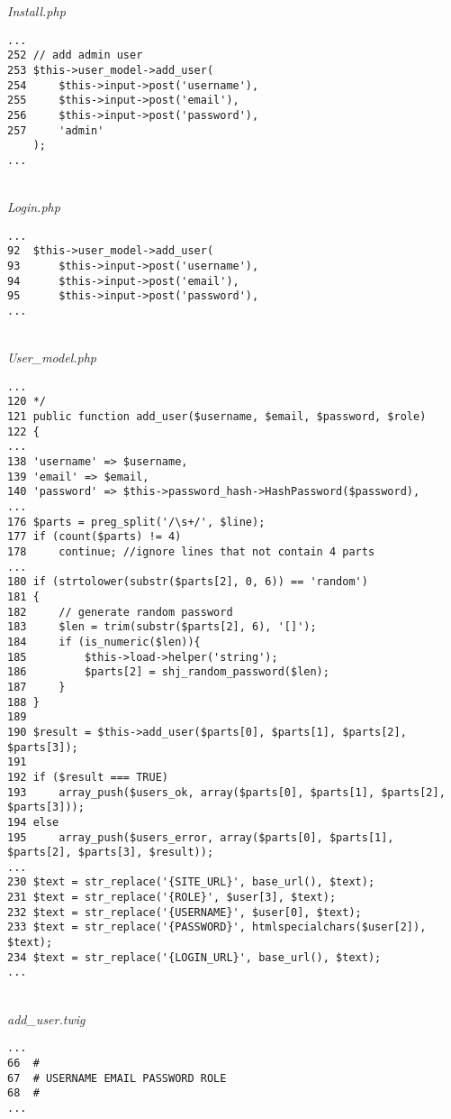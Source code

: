 \textit{Install.php}
\begin{lstlisting}[basicstyle=\ttfamily, frame=single,
columns=fullflexible, keepspaces=true, breaklines=true]
...
252	// add admin user
253	$this->user_model->add_user(
254		$this->input->post('username'),
255		$this->input->post('email'),
256		$this->input->post('password'),
257		'admin'
	);
...
\end{lstlisting}
~\\
\textit{Login.php}
\begin{lstlisting}[basicstyle=\ttfamily, frame=single,
columns=fullflexible, keepspaces=true, breaklines=true]
...
92	$this->user_model->add_user(
93		$this->input->post('username'),
94		$this->input->post('email'),
95		$this->input->post('password'),
...
\end{lstlisting}
~\\
\textit{User\_model.php}
\begin{lstlisting}[basicstyle=\ttfamily, frame=single,
columns=fullflexible, keepspaces=true, breaklines=true]
...
120	*/
121	public function add_user($username, $email, $password, $role)
122	{
...
138	'username' => $username,
139	'email' => $email,
140	'password' => $this->password_hash->HashPassword($password),
...
176	$parts = preg_split('/\s+/', $line);
177	if (count($parts) != 4)
178		continue; //ignore lines that not contain 4 parts
...
180	if (strtolower(substr($parts[2], 0, 6)) == 'random')
181	{
182		// generate random password
183		$len = trim(substr($parts[2], 6), '[]');
184		if (is_numeric($len)){
185			$this->load->helper('string');
186			$parts[2] = shj_random_password($len);
187		}
188	}
189	
190	$result = $this->add_user($parts[0], $parts[1], $parts[2], $parts[3]);
191	
192	if ($result === TRUE)
193		array_push($users_ok, array($parts[0], $parts[1], $parts[2], $parts[3]));
194	else
195		array_push($users_error, array($parts[0], $parts[1], $parts[2], $parts[3], $result));
...
230	$text = str_replace('{SITE_URL}', base_url(), $text);
231	$text = str_replace('{ROLE}', $user[3], $text);
232	$text = str_replace('{USERNAME}', $user[0], $text);
233	$text = str_replace('{PASSWORD}', htmlspecialchars($user[2]), $text);
234	$text = str_replace('{LOGIN_URL}', base_url(), $text);
...
\end{lstlisting}
~\\
\textit{add\_user.twig}
\begin{lstlisting}[basicstyle=\ttfamily, frame=single,
columns=fullflexible, keepspaces=true, breaklines=true]
...
66	#
67	# USERNAME EMAIL PASSWORD ROLE
68	#
...
\end{lstlisting}
